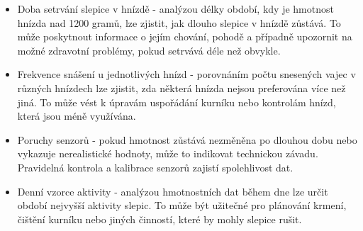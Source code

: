 \begin{itemize}
    \item Doba setrvání slepice v hnízdě - analýzou délky období, kdy je hmotnost hnízda nad 1200 gramů, lze zjistit, jak dlouho slepice v hnízdě zůstává.
    To může poskytnout informace o jejím chování, pohodě a případně upozornit na možné zdravotní problémy, pokud setrvává déle než obvykle.
    \item Frekvence snášení u jednotlivých hnízd - porovnáním počtu snesených vajec v různých hnízdech lze zjistit, zda některá hnízda nejsou preferována více než jiná.
    To může vést k úpravám uspořádání kurníku nebo kontrolám hnízd, která jsou méně využívána.
    \item Poruchy senzorů - pokud hmotnost zůstává nezměněna po dlouhou dobu nebo vykazuje nerealistické hodnoty, může to indikovat technickou závadu.
    Pravidelná kontrola a kalibrace senzorů zajistí spolehlivost dat.
    \item Denní vzorce aktivity - analýzou hmotnostních dat během dne lze určit období nejvyšší aktivity slepic.
    To může být užitečné pro plánování krmení, čištění kurníku nebo jiných činností, které by mohly slepice rušit.
\end{itemize}

%
%
%

